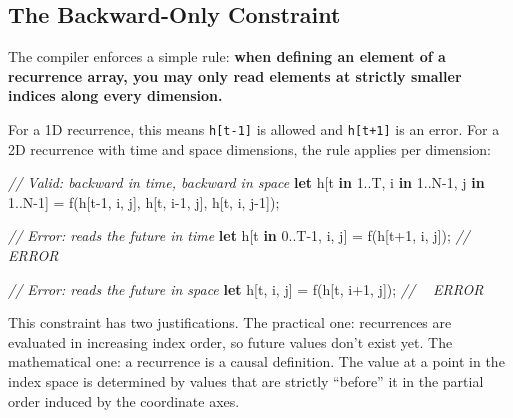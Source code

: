 \documentclass[11pt,]{article}
\newenvironment{Shaded}{}{}
\newcommand{\CommentTok}[1]{\textcolor[rgb]{0.38,0.63,0.69}{\textit{#1}}}
\newcommand{\DecValTok}[1]{\textcolor[rgb]{0.25,0.63,0.44}{#1}}
\newcommand{\KeywordTok}[1]{\textcolor[rgb]{0.00,0.44,0.13}{\textbf{#1}}}
\newcommand{\NormalTok}[1]{#1}
\newcommand{\OperatorTok}[1]{\textcolor[rgb]{0.40,0.40,0.40}{#1}}
\begin{document}
\hypertarget{the-backward-only-constraint}{%
\subsection{The Backward-Only
Constraint}\label{the-backward-only-constraint}}

The compiler enforces a simple rule: \textbf{when defining an element of
a recurrence array, you may only read elements at strictly smaller
indices along every dimension.}

For a 1D recurrence, this means \texttt{h{[}t-1{]}} is allowed and
\texttt{h{[}t+1{]}} is an error. For a 2D recurrence with time and space
dimensions, the rule applies per dimension:

\begin{Shaded}
\begin{Highlighting}[]
\CommentTok{// Valid: backward in time, backward in space}
\KeywordTok{let}\NormalTok{ h}\OperatorTok{[}\NormalTok{t }\KeywordTok{in} \DecValTok{1.}\NormalTok{.T, i }\KeywordTok{in} \DecValTok{1.}\NormalTok{.N-}\DecValTok{1}\NormalTok{, j }\KeywordTok{in} \DecValTok{1.}\NormalTok{.N-}\DecValTok{1}\OperatorTok{]}\NormalTok{ =}
\NormalTok{    f(h}\OperatorTok{[}\NormalTok{t-}\DecValTok{1}\NormalTok{, i, j}\OperatorTok{]}\NormalTok{, h}\OperatorTok{[}\NormalTok{t, i-}\DecValTok{1}\NormalTok{, j}\OperatorTok{]}\NormalTok{, h}\OperatorTok{[}\NormalTok{t, i, j-}\DecValTok{1}\OperatorTok{]}\NormalTok{);}

\CommentTok{// Error: reads the future in time}
\KeywordTok{let}\NormalTok{ h}\OperatorTok{[}\NormalTok{t }\KeywordTok{in} \DecValTok{0.}\NormalTok{.T-}\DecValTok{1}\NormalTok{, i, j}\OperatorTok{]}\NormalTok{ = f(h}\OperatorTok{[}\NormalTok{t+}\DecValTok{1}\NormalTok{, i, j}\OperatorTok{]}\NormalTok{);}
\CommentTok{//                               ^^^^^^ ERROR}

\CommentTok{// Error: reads the future in space}
\KeywordTok{let}\NormalTok{ h}\OperatorTok{[}\NormalTok{t, i, j}\OperatorTok{]}\NormalTok{ = f(h}\OperatorTok{[}\NormalTok{t, i+}\DecValTok{1}\NormalTok{, j}\OperatorTok{]}\NormalTok{);}
\CommentTok{//                      ^^^^^^ ERROR}
\end{Highlighting}
\end{Shaded}

This constraint has two justifications. The practical one: recurrences
are evaluated in increasing index order, so future values don't exist
yet. The mathematical one: a recurrence is a causal definition. The
value at a point in the index space is determined by values that are
strictly ``before'' it in the partial order induced by the coordinate
axes.
\end{document}
